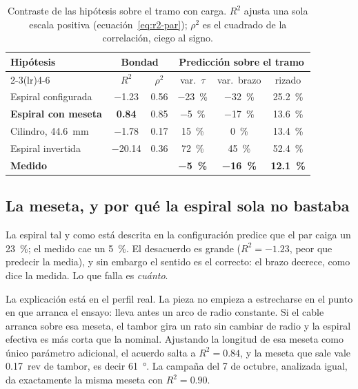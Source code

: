 \begin{table}[H]
\centering
\caption{Contraste de las hipótesis sobre el tramo con carga. $R^2$ ajusta una sola escala positiva
(ecuación~\eqref{eq:r2-par}); $\rho^2$ es el cuadrado de la correlación, ciego al signo.}
\label{tab:contraste}
\small
\begin{tabularx}{\textwidth}{@{}Xccccc@{}}
\toprule
Hipótesis & \multicolumn{2}{c}{Bondad} & \multicolumn{3}{c}{Predicción sobre el tramo} \\
\cmidrule(lr){2-3}\cmidrule(lr){4-6}
 & $R^2$ & $\rho^2$ & var.\ $\tau$ & var.\ brazo & rizado \\
\midrule
Espiral configurada & \num{-1.23} & \num{0.56} & \SI{-23}{\percent} & \SI{-32}{\percent} & \SI{25.2}{\percent} \\
\textbf{Espiral con meseta} & \textbf{\num{0.84}} & \num{0.85} & \SI{-5}{\percent} & \SI{-17}{\percent} & \SI{13.6}{\percent} \\
Cilindro, \SI{44.6}{\milli\metre} & \num{-1.78} & \num{0.17} & \SI{+15}{\percent} & \SI{0}{\percent} & \SI{13.4}{\percent} \\
Espiral invertida & \num{-20.14} & \num{0.36} & \SI{+72}{\percent} & \SI{+45}{\percent} & \SI{52.4}{\percent} \\
\midrule
\textbf{Medido} & & & \textbf{\SI{-5}{\percent}} & \textbf{\SI{-16}{\percent}} & \textbf{\SI{12.1}{\percent}} \\
\bottomrule
\end{tabularx}
\end{table}

\subsection{La meseta, y por qué la espiral sola no bastaba}

La espiral tal y como está descrita en la configuración predice que el par caiga un
\SI{23}{\percent}; el medido cae un \SI{5}{\percent}. El desacuerdo es grande ($R^2 = \num{-1.23}$,
peor que predecir la media), y sin embargo el sentido es el correcto: el brazo decrece, como dice la
medida. Lo que falla es \emph{cuánto}.

La explicación está en el perfil real. La pieza no empieza a estrecharse en el punto en que arranca
el ensayo: lleva antes un arco de radio constante. Si el cable arranca sobre esa meseta, el tambor
gira un rato sin cambiar de radio y la espiral efectiva es más corta que la nominal. Ajustando la
longitud de esa meseta como único parámetro adicional, el acuerdo salta a $R^2 = \num{0.84}$, y la
meseta que sale vale \SI{0.17}{rev} de tambor, es decir \SI{61}{\degree}. La campaña del 7 de
octubre, analizada igual, da exactamente la misma meseta con $R^2 = \num{0.90}$.

